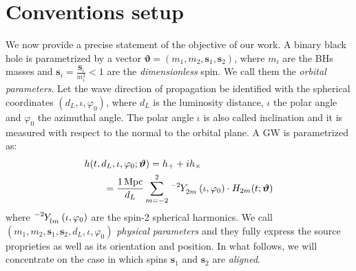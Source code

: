 \section{Conventions setup}
\label{sec:setup}
We now provide a precise statement of the objective of our work.
A binary black hole is parametrized by a vector $ \boldsymbol{\vartheta} = (m_1,m_2, \mathbf{s}_1,\mathbf{s}_2) $, where $m_i$ are the BHs masses and $\mathbf{s}_i = \frac{\mathbf{S}_i}{m_i^2} <1$ are the \textit{dimensionless} spin. 
We call them the \textit{orbital parameters}.
Let the wave direction of propagation be identified with the spherical coordinates $(d_L, \iota, \varphi_0)$, where $d_L$ is the luminosity distance, $\iota$ the polar angle and $\varphi_0$ the azimuthal angle. The polar angle $\iota$ is also called inclination and it is measured with respect to the normal to the orbital plane.
A GW is parametrized as:
\begin{align} \label{eq:h_parametrization}
	&h(t, d_L,\iota,\varphi_0; \boldsymbol{\vartheta}) = h_+ + i h_\times \nonumber \\
		&\qquad= {\frac{\SI{1}{Mpc}}{d_L}} \sum_{m = -2}^{2} \tensor[^{-2}]{Y}{_{2 m}}(\iota, \varphi_0) \cdot H_{2m}(t; \boldsymbol{\vartheta})
\end{align}
where $\tensor[^{-2}]{Y}{_{l m}}(\iota, \varphi_0)$ are the spin-2 spherical harmonics.
We call $(m_1,m_2, \mathbf{s}_1,\mathbf{s}_2, d_L,\iota,\varphi_0)$ \textit{physical parameters} and they fully express the source 
proprieties as well as its orientation and position. In what follows, we will concentrate on the case in which 
spins $\mathbf{s}_1$ and $\mathbf{s}_2$ are \textit{aligned}. 

